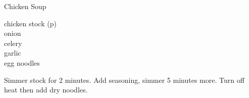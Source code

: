 
\begin{recipe}{Chicken Soup}
  \maketitle

  \begin{ingredients2}[3]
    chicken stock (p\pageref{Chicken Stock})\\
    onion\\
    celery\\
    garlic\\
    egg noodles
  \end{ingredients2}

  Simmer stock for 2 minutes. Add seasoning, simmer 5 minutes more. Turn
  off heat then add dry noodles.
\end{recipe}

